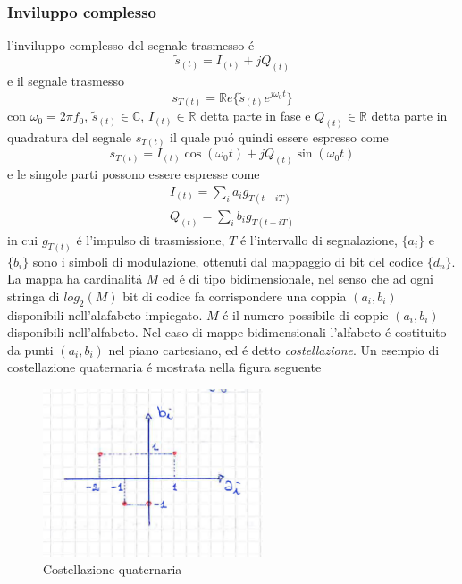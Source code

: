         \subsubsection{Inviluppo complesso}
            l'inviluppo complesso del segnale trasmesso é 
            \[
                \tilde{s}_{(t)} = I_{(t)} +j Q_{(t)}      
            \]
            e il segnale trasmesso
            \[
                  s_{T(t)} = \mathbb{R}e\{\tilde{s}_{(t)}e^{j\omega_0t}\}
            \]
            con $\omega_0 = 2\pi f_0$, $\tilde{s}_{(t)}\in \mathbb{C}$, $I_{(t)}\in \mathbb{R}$ detta parte in fase e 
            $Q_{(t)}\in \mathbb{R}$ detta parte in quadratura del segnale $s_{T(t)}$ il quale puó quindi essere espresso 
            come 
            \[
                s_{T(t)} =I_{(t)}\cos(\omega_0t)+jQ_{(t)}\sin(\omega_0t)  
            \]  
            e le singole parti possono essere espresse come 
            \begin{gather}
                I_{(t)} = \sum_{i}a_ig_{T(t-iT)}\nonumber \\
                Q_{(t)} = \sum_{i}b_ig_{T(t-iT)}\nonumber
            \end{gather}
            in cui $g_{T(t)}$ é l'impulso di trasmissione, $T$ é l'intervallo di segnalazione,
            $\{a_i\}$ e $\{b_i\}$ sono i simboli di modulazione, ottenuti dal mappaggio di bit del codice $\{d_n\}$.
            La mappa ha cardinalitá $M$ ed é di tipo bidimensionale, nel senso che ad ogni stringa di $log_2(M)$ bit di codice
            fa corrispondere una coppia $(a_i,b_i)$ disponibili nell'alafabeto impiegato. $M$ é il numero possibile di coppie $(a_i,b_i)$ 
            disponibili nell'alfabeto. Nel caso di mappe bidimensionali l'alfabeto é costituito da punti $(a_i,b_i)$ nel piano cartesiano,
            ed é detto \emph{costellazione}. Un esempio di costellazione quaternaria é mostrata nella figura seguente
            \begin{figure}[H]
                \centering
                \includegraphics[width = 6.5cm]{media/costellazione quaternaria.png}
                \caption{Costellazione quaternaria}
            \end{figure}
